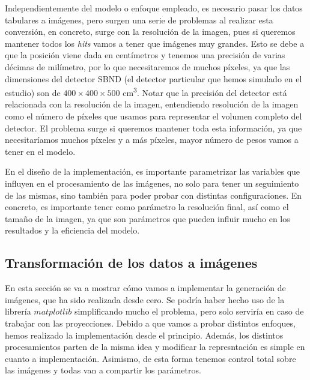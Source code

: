 \documentclass[a4paper,12pt,oneside,titlepage]{book}
\begin{document}
Independientemente del modelo o enfoque empleado, es necesario pasar los datos tabulares a imágenes, pero surgen una serie de problemas al realizar esta conversión, en concreto, surge con la resolución de la imagen, pues si queremos mantener todos los \textit{hits} vamos a tener que imágenes muy grandes. Esto se debe a que la posición viene dada en centímetros y tenemos una precisión de varias décimas de milímetro, por lo que necesitaremos de muchos píxeles, ya que las dimensiones del detector SBND (el detector particular que hemos simulado en el estudio) son de $400\times400\times500$ \si{\cubic\cm}. Notar que la precisión del detector está relacionada con la resolución de la imagen, entendiendo resolución de la imagen como el número de píxeles que usamos para representar el volumen completo del detector. El problema surge si queremos mantener toda esta información, ya que necesitaríamos muchos píxeles y a más píxeles, mayor número de pesos vamos a tener en el modelo.

En el diseño de la implementación, es importante parametrizar las variables que influyen en el procesamiento de las imágenes, no solo para tener un seguimiento de las mismas, sino también para poder probar con distintas configuraciones. En concreto, es importante tener como parámetro la resolución final, así como el tamaño de la imagen, ya que son parámetros que pueden influir mucho en los resultados y la eficiencia del modelo.

\subsection{Transformación de los datos a imágenes}
\label{sec:trans_datos}

En esta sección se va a mostrar cómo vamos a implementar la generación de imágenes, que ha sido realizada desde cero. Se podría haber hecho uso de la librería $matplotlib$ simplificando mucho el problema, pero solo serviría en caso de trabajar con las proyecciones. Debido a que vamos a probar distintos enfoques, hemos realizado la implementación desde el principio. Además, los distintos procesamientos parten de la misma idea y modificar la represntación es simple en cuanto a implementación. Asimismo, de esta forma tenemos control total sobre las imágenes y todas van a compartir los parámetros.
\end{document}
